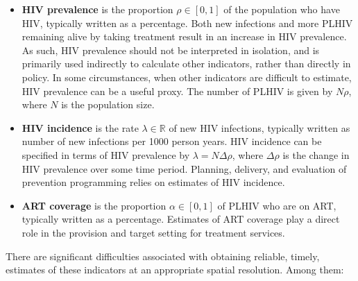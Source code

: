 \documentclass[a4paper, nobind]{templates/ociamthesis}
\providecommand{\tightlist}{%
  \setlength{\itemsep}{0pt}\setlength{\parskip}{0pt}}
\begin{document}
\begin{itemize}
\tightlist
\item
  \textbf{HIV prevalence} is the proportion \(\rho \in [0, 1]\) of the population who have HIV, typically written as a percentage.
  Both new infections and more PLHIV remaining alive by taking treatment result in an increase in HIV prevalence.
  As such, HIV prevalence should not be interpreted in isolation, and is primarily used indirectly to calculate other indicators, rather than directly in policy.
  In some circumstances, when other indicators are difficult to estimate, HIV prevalence can be a useful proxy.
  The number of PLHIV is given by \(N\rho\), where \(N\) is the population size.
\item
  \textbf{HIV incidence} is the rate \(\lambda \in \mathbb{R}\) of new HIV infections, typically written as number of new infections per 1000 person years.
  HIV incidence can be specified in terms of HIV prevalence by \(\lambda = N\Delta\rho\), where \(\Delta\rho\) is the change in HIV prevalence over some time period.
  Planning, delivery, and evaluation of prevention programming relies on estimates of HIV incidence.
\item
  \textbf{ART coverage} is the proportion \(\alpha \in [0, 1]\) of PLHIV who are on ART, typically written as a percentage.
  Estimates of ART coverage play a direct role in the provision and target setting for treatment services.
\end{itemize}

There are significant difficulties associated with obtaining reliable, timely, estimates of these indicators at an appropriate spatial resolution.
Among them:
\end{document}
